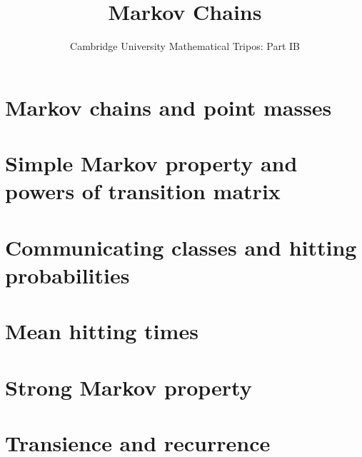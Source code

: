 \documentclass{article}
\title{Markov Chains}
\author{Cambridge University Mathematical Tripos: Part IB}
\begin{document}
\maketitle

\tableofcontentsnewpage{}

\section{Markov chains and point masses}

\section{Simple Markov property and powers of transition matrix}

\section{Communicating classes and hitting probabilities}

\section{Mean hitting times}

\section{Strong Markov property}

\section{Transience and recurrence}

\end{document}
